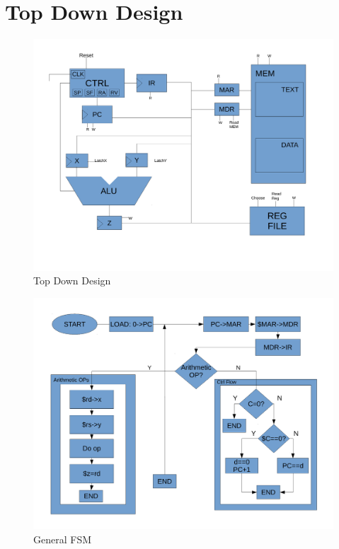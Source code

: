 \documentclass[conference]{IEEEtran}
\begin{document}
\section{Top Down Design}
\begin{figure}[!t]
\centering
\includegraphics[width=\textwidth]{TopDownDesignDraftp1.pdf}
\caption{Top Down Design}
\label{fig_sim}
\end{figure}

\clearpage
\begin{figure}[!t]
\centering
\includegraphics[width=\textwidth]{TopDownDesignDraftp2.pdf}
\caption{General FSM}
\label{fig_sim}
\end{figure}
\end{document}
